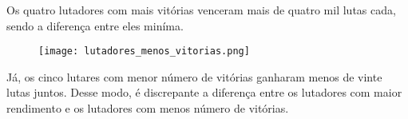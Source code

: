 \documentclass{article}
\begin{document}
\par Os quatro lutadores com mais vitórias venceram mais de quatro mil lutas cada, sendo a diferença entre eles miníma. 

\begin{figure}[H] 
    \centering 
    \texttt{[image: lutadores\_menos\_vitorias.png]} 
\end{figure}

\par Já, os cinco lutares com menor número de vitórias ganharam menos de vinte lutas juntos. Desse modo, é discrepante a diferença entre os lutadores com maior rendimento e os lutadores com menos número de vitórias.
\end{document}
